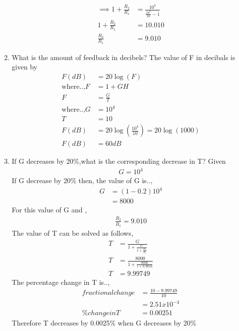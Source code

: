 \begin{enumerate}[label=\thesubsection.\arabic*.,ref=\thesubsection.\theenumi]
\begin{align}
\implies 1+\frac{R_2}{R_1} &= \frac{10^4}{\frac{10^4}{10}-1}
\\
1+\frac{R_2}{R_1} &= 10.010
\\
\frac{R_2}{R_1} &= 9.010
\end{align}
\item What is the amount of feedback in decibels?
\solution The value of F in decibals is given by 
\begin{align}
    F(dB) &= 20\log(F)\\
\text{where..,} F &= 1+GH \\
F &= \frac{G}{T}\\
\text{where..,} G&=10^4 \\ T &= 10\\
F(dB) &= 20\log(\frac{10^4}{10})=20\log(1000)\\
F(dB) &= 60 dB
\end{align}
\item If G decreases by 20\%,what is the corresponding decrease in T?
\solution Given
\begin{align}
G = 10^4
\end{align}
If G decrease by 20\% then,
the value of G is..,
\begin{align}
    G &= (1-0.2)10^4 \\
      &= 8000
\end{align}
For this value of G and ,
\begin{align}
    \frac{R_2}{R_1} = 9.010
\end{align}
The value of T can be solved as follows,
\begin{align}
 T &= \frac{G}{1+\frac{G}{1+\frac{R_2}{R_1}}}\\
 T &= \frac{8000}{1+\frac{8000}{1+0.9010}}\\
 T &= 9.99749
\end{align}
The percentage change in T is..,
\begin{align}
    fractionalchange &= \frac{10-9.99749}{10}\\
      &= 2.51x10^{-4}\\
     \% change in T &= 0.00251
\end{align}
Therefore T decreases by 0.0025\% when G decreases by 20\%
\end{enumerate}

